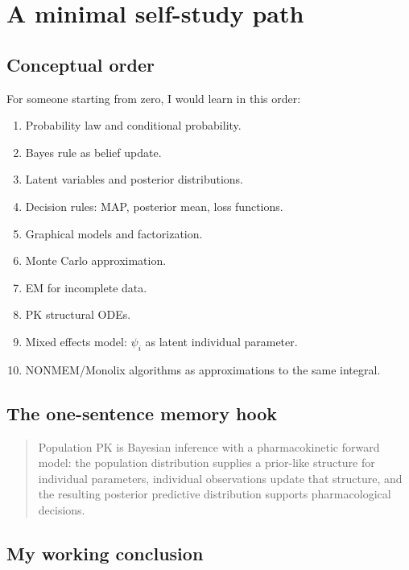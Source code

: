 \documentclass[a4paper]{article}
\begin{document}


\section{A minimal self-study path}

\subsection{Conceptual order}

For someone starting from zero, I would learn in this order:

\begin{enumerate}[leftmargin=2em]
  \item Probability law and conditional probability.
  \item Bayes rule as belief update.
  \item Latent variables and posterior distributions.
  \item Decision rules: MAP, posterior mean, loss functions.
  \item Graphical models and factorization.
  \item Monte Carlo approximation.
  \item EM for incomplete data.
  \item PK structural ODEs.
  \item Mixed effects model: \(\psi_i\) as latent individual parameter.
  \item NONMEM/Monolix algorithms as approximations to the same integral.
\end{enumerate}

\subsection{The one-sentence memory hook}

\begin{quote}
  Population PK is Bayesian inference with a pharmacokinetic forward model: the population distribution supplies a prior-like structure for individual parameters, individual observations update that structure, and the resulting posterior predictive distribution supports pharmacological decisions.
\end{quote}

\subsection{My working conclusion}
\end{document}
